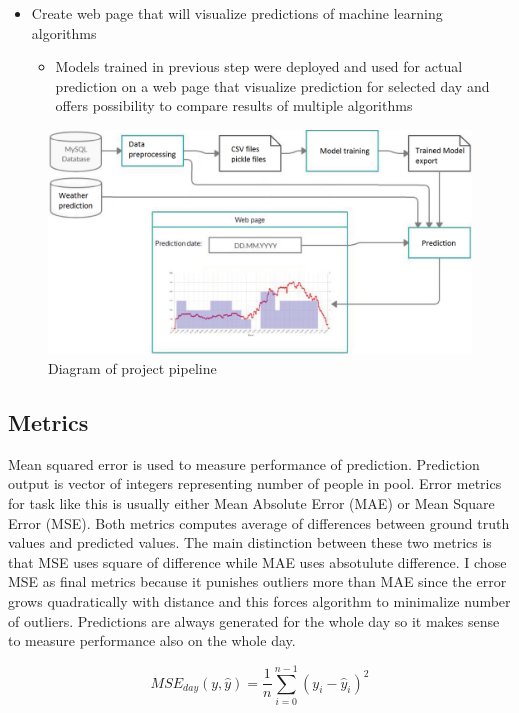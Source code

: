 \documentclass{article}
\begin{document}
\begin{itemize}
\item Create web page that will visualize predictions of machine learning algorithms
\begin{itemize}
\item Models trained in previous step were deployed and used for actual prediction on a web page that visualize prediction for selected day and offers possibility to compare results of multiple algorithms
\end{itemize}
\end{itemize}

\begin{figure}[h!]
\centering
\includegraphics[width=12cm]{imgs/project_pipeline}
\caption{Diagram of project pipeline}
\label{fig:diagram_pipeline}
\end{figure}

\subsection{Metrics} \label{sec:metrics}
Mean squared error is used to measure performance of prediction. Prediction output is vector of integers representing number of people in pool. Error metrics for task like this is usually either Mean Absolute Error (MAE) or Mean Square Error (MSE). Both metrics computes average of differences between ground truth values and predicted values. The main distinction between these two metrics is that MSE uses square of difference while MAE uses absotulute difference. I chose MSE as final metrics because it punishes outliers more than MAE since the error grows quadratically with distance and this forces algorithm to minimalize number of outliers. Predictions are always generated for the whole day so it makes sense to measure performance also on the whole day. 

\begin{equation}
\label{eq:mse}
MSE_{day}(y,\hat{y}) = \dfrac{1}{n} \sum^{n-1}_{i=0}(y_i-\hat{y}_i)^2
\end{equation}
\end{document}
